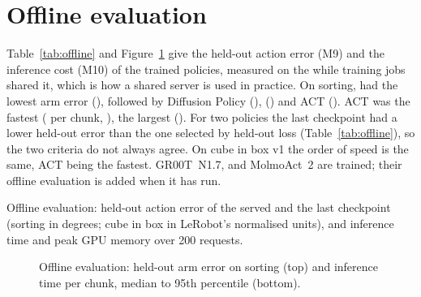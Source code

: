
\section{Offline evaluation}\label{sec:offline}

Table~\ref{tab:offline} and Figure~\ref{fig:offline} give the held-out action error (M9) and the inference cost (M10)
of the trained policies, measured on the  while training jobs shared it, which is how a shared server
is used in practice. On sorting, \smolvla{} had the lowest arm error (\degree),
followed by Diffusion Policy (\degree), \groot{} (\degree)
and ACT (\degree). ACT was the fastest ( per chunk,
), \groot{} the largest (). For two policies the last
checkpoint had a lower held-out error than the one selected by held-out loss (Table~\ref{tab:offline}), so the two
criteria do not always agree. On cube in box v1 the order of speed is the same, ACT being the fastest. GR00T~N1.7,
\pizerofive{} and MolmoAct~2 are trained; their offline evaluation is added when it has run.

\begin{table}[htbp]
  \centering
  \small
  \begin{adjustbox}{max width=\textwidth}
  \end{adjustbox}
  \caption{Offline evaluation: held-out action error of the served and the last checkpoint (sorting in degrees; cube in
           box in LeRobot's normalised units), and inference time and peak GPU memory over 200 requests.}\label{tab:offline}
\end{table}

\begin{figure}[htbp]
  \centering
  \caption{Offline evaluation: held-out arm error on sorting (top) and inference time per chunk, median to 95th
           percentile (bottom).}
  \label{fig:offline}
\end{figure}

